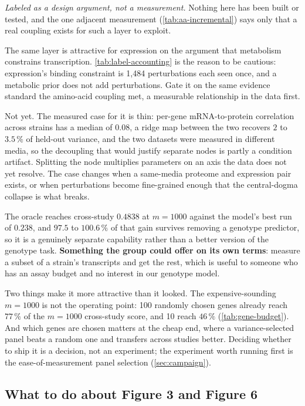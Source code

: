 \emph{Labeled as a design argument, not a measurement.} Nothing here has been built or
tested, and the one adjacent measurement (\cref{tab:aa-incremental}) says only that a real
coupling exists for such a layer to exploit.

 The same layer is attractive for expression on the
argument that metabolism constrains transcription. \cref{tab:label-accounting} is the
reason to be cautious: expression's binding constraint is 1,484 perturbations each seen
once, and a metabolic prior does not add perturbations. Gate it on the same evidence
standard the amino-acid coupling met, a measurable relationship in the data first.

 Not yet. The measured case for it is
thin: per-gene mRNA-to-protein correlation across strains has a median of $0.08$, a ridge
map between the two recovers $2$ to $3.5\,\%$ of held-out variance, and the two datasets
were measured in different media, so the decoupling that would justify separate nodes is
partly a condition artifact. Splitting the node multiplies parameters on an axis the data
does not yet resolve. The case changes when a same-media proteome and expression pair
exists, or when perturbations become fine-grained enough that the central-dogma collapse is
what breaks.

 The oracle reaches cross-study
$0.4838$ at $m = 1000$ against the model's best run of $0.238$, and $97.5$ to $100.6\,\%$ of that gain
survives removing a genotype predictor, so it is a genuinely separate capability rather than
a better version of the genotype task. \textbf{Something the group could offer on its own
terms}: measure a subset of a strain's transcripts and get the rest, which is useful to
someone who has an assay budget and no interest in our genotype model.

Two things make it more attractive than it looked. The expensive-sounding $m = 1000$ is not
the operating point: 100 randomly chosen genes already reach $77\,\%$ of the $m = 1000$
cross-study score, and 10 reach $46\,\%$ (\cref{tab:gene-budget}). And which genes are chosen
matters at the cheap end, where a variance-selected panel beats a random one and transfers
across studies better. Deciding whether to ship it is a decision, not an experiment; the
experiment worth running first is the ease-of-measurement panel selection
(\cref{sec:campaign}).

\subsection{What to do about Figure 3 and Figure 6}

